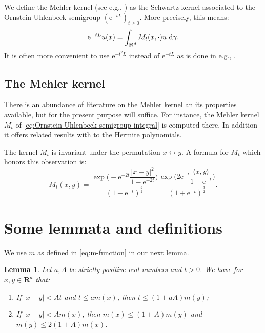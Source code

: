 \documentclass[a4paper,oneside,10pt]{amsproc}
\newtheorem{lemma}{Lemma}
\theoremstyle{remark}
\newcommand{\D}{\,\textup{d}}
\newcommand{\la}{\langle}
\newcommand{\ra}{\rangle}
\renewcommand{\leq}{\leqslant}
\renewcommand{\leq}{\leqslant}
\renewcommand{\geq}{\geqslant}
\newcommand{\R}{\mathbf R}
\newcommand{\e}{\mathrm{e}} %
\renewcommand{\leq}{\leqslant}%
\renewcommand{\geq}{\geqslant}%
\begin{document}
We define the Mehler kernel (see e.g., \textcite{Sjogren1997}) as the
Schwartz kernel associated to the Ornstein-Uhlenbeck semigroup
$(\e^{-tL})_{t \geq 0}$. More precisely, this means:
\begin{equation}
  \label{eq:Ornstein-Uhlenbeck-semigroup-integral}
  \e^{-tL} u(x) = \int_{\R^d} M_t(x, \cdot) u \, \D\gamma.
\end{equation}
It is often more convenient to use $\e^{-t^2 L}$ instead of $\e^{-tL}$
as is done in e.g., \textcite{Portal2012}.

\subsection{The Mehler kernel}
There is an abundance of literature on the Mehler kernel an its
properties available, but for the present purpose
\textcite{Sjogren1997} will suffice. For instance, the Mehler kernel
$M_t$ of \eqref{eq:Ornstein-Uhlenbeck-semigroup-integral} is computed
there. In addition it offers related results with to the Hermite
polynomials.

The kernel $M_t$ is invariant under the permutation $x
\leftrightarrow y$. A formula for $M_t$ which honors this
observation is:
\begin{equation}
  \label{eq:Mehler-kernel}
  M_t(x, y) = \frac{\exp\biggl(-\e^{-2t} \dfrac{|x - y|^2}{1
      - \e^{-2 t}}  \biggr)}{(1 - \e^{-t})^{\frac{d}2}}
  \frac{\exp\biggl(2\e^{-t} \dfrac{\la x, y \ra}{1 + \e^{-t}}
    \biggr)}{(1 + \e^{-t})^{\frac{d}2}}.
\end{equation}

\section{Some lemmata and definitions}
We use $m$ as defined in \eqref{eq:m-function} in our next lemma.
\begin{lemma}\label{lem:m-xy-equivalence}
  Let $a, A$ be strictly positive real numbers and $t > 0$. We have
  for $x, y \in \R^d$ that:
  \begin{enumerate}
  \item If $|x - y| < A t$ and $t \leq a m(x)$, then $t
    \leq (1 + aA) m(y)$;
  \item If $|x - y| < A m(x)$, then $m(x) \leq (1 +
    A) m(y)$ and $m(y) \leq 2 (1 + A) m(x)$. 
  \end{enumerate}
\end{lemma}
\end{document}
